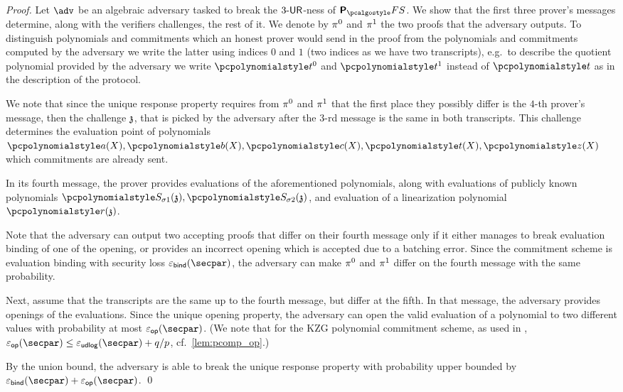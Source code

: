 \begin{proof}
    Let $\adv$ be an algebraic adversary tasked to break the ${3\text{-}\mathsf{UR}}$-ness of
      $\plonkprotfs$. We show that the first three prover's messages determine, along with 	the verifiers challenges, the rest of it. We denote by $\pi^0$ and $\pi^1$ the two proofs that the adversary outputs. To distinguish polynomials and commitments which an honest prover would send in the proof from the polynomials and commitments computed by the adversary we write the latter using indices $0$ and $1$ (two indices as we have two transcripts), e.g.~to describe the quotient polynomial provided by the adversary we write $\p{t}^0$ and $\p{t}^1$ instead of $\p{t}$ as in the description of the protocol.
  
    We note that since the unique response property requires from $\pi^{0}$ and $\pi^{1}$ that the first place they possibly differ is the $4$-th prover's message, then the challenge $\mathfrak{z}$, that is picked by the adversary after the $3$-rd message is the same in both transcripts. This challenge determines the evaluation point of polynomials $\p{a}(X), \p{b}(X), \p{c}(X), \p{t}(X), \p{z}(X)$ which commitments are already sent.
  
    In its fourth message, the prover provides evaluations of the aforementioned polynomials, along with evaluations of publicly known polynomials $
    \p{S_{\sigma 1}} (\chz), \p{S_{\sigma 2}} (\chz)$, and evaluation of a linearization polynomial $\p{r}(\chz)$.

    Note that the adversary can output two accepting proofs that differ on their fourth message only if it either manages to break evaluation binding of one of the opening, or provides an incorrect opening which is accepted due to a batching error. Since the commitment scheme is evaluation binding with security loss $\epsbinding (\secpar)$, %
	the adversary can make $\pi^{0}$ and $\pi^{1}$ differ on the fourth message with the same probability. %
  
    Next, assume that the transcripts are the same up to the fourth message, but differ at the fifth. In that message, the adversary provides openings of the evaluations. Since the unique opening property, the adversary can open the valid evaluation of a polynomial to two different values with probability at most $\epsop (\secpar)$. (We note that for the KZG polynomial commitment scheme, as used in \cite{EPRINT:GabWilCio19}, $\epsop (\secpar) \leq \epsudlog (\secpar) + \infrac{q}{p}$, cf.~\cref{lem:pcomp_op}.)
  
    By the union bound, the adversary is able to break the unique response property with probability upper bounded by $\epsbinding (\secpar) + \epsop (\secpar)$.
    \qed
    \end{proof}

